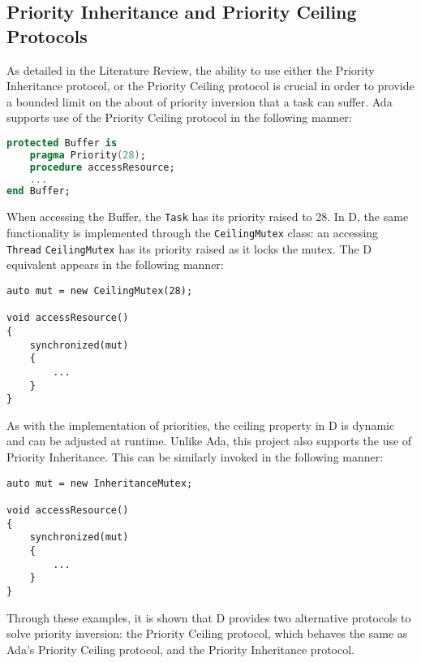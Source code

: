 \subsection{Priority Inheritance and Priority Ceiling Protocols}
As detailed in the Literature Review, the ability to use either the Priority
Inheritance protocol, or the Priority Ceiling protocol is crucial in order to
provide a bounded limit on the about of priority inversion that a task can
suffer. Ada supports use of the Priority Ceiling protocol in the following
manner: 
\begin{lstlisting}[basicstyle=\small,language=Ada]
protected Buffer is 
    pragma Priority(28); 
    procedure accessResource; 
    ...
end Buffer; 
\end{lstlisting}
When accessing the Buffer, the \texttt{Task} has its priority raised
to 28. 
In D, the same functionality is implemented through 
the \texttt{CeilingMutex} class: an accessing \texttt{Thread} 
\texttt{CeilingMutex} has its priority raised as it locks the mutex. 
The D equivalent appears in the following manner: 
\begin{lstlisting}[basicstyle=\small]
auto mut = new CeilingMutex(28); 

void accessResource()
{
    synchronized(mut)
    {
        ...
    }
}
\end{lstlisting}
As with the implementation of priorities, the ceiling property in D is dynamic 
and can be adjusted at runtime. 
Unlike Ada, this project also supports the use of Priority Inheritance. 
This can be similarly invoked in the following manner: 
\begin{lstlisting}[basicstyle=\small]
auto mut = new InheritanceMutex; 

void accessResource()
{
    synchronized(mut)
    {
        ...
    }
}
\end{lstlisting}
Through these examples, it is shown that D provides two alternative protocols
to solve priority inversion: the Priority Ceiling protocol, which behaves the
same as Ada's Priority Ceiling protocol, and the Priority Inheritance protocol. 

